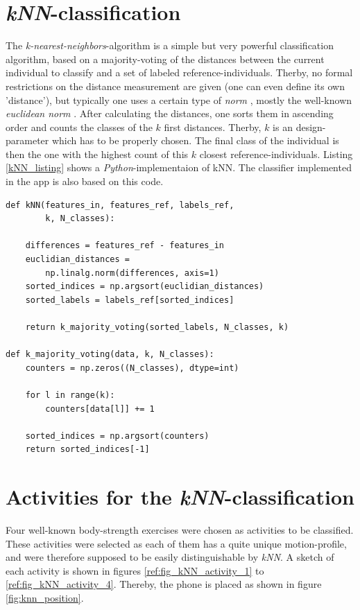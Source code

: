 \documentclass[journal]{IEEEtran}
\begin{document}
\section{\textit{kNN}-classification} 
The \textit{k-nearest-neighbors}-algorithm \cite{noauthor_k-nearest_2021} is a
simple but very powerful classification algorithm, based on a majority-voting of
the distances between the current individual to classify and a set of labeled
reference-individuals. Therby, no formal restrictions on the distance
measurement are given (one can even define its own 'distance'), but typically
one uses a certain type of \textit{norm} \cite{noauthor_norm_2021}, mostly the
well-known \textit{euclidean norm} \cite{noauthor_euclidean_2021}. After
calculating the distances, one sorts them in ascending order and counts the
classes of the $k$ first distances. Therby, $k$ is an design-parameter which
has to be properly chosen. The final class of the individual is then the one with the
highest count of this $k$ closest reference-individuals.\newline
Listing \ref{kNN_listing} shows a \textit{Python}-implementaion of kNN. The
classifier implemented in the app is also based on this code.\newline


\begin{lstlisting}[language=iPython, label=kNN_listing, captionpos=b,caption=A simple python-implementation of \textit{kNN}.]
def kNN(features_in, features_ref, labels_ref, 
        k, N_classes): 

    differences = features_ref - features_in 
    euclidian_distances = 
        np.linalg.norm(differences, axis=1) 
    sorted_indices = np.argsort(euclidian_distances) 
    sorted_labels = labels_ref[sorted_indices]
    
    return k_majority_voting(sorted_labels, N_classes, k)
    
def k_majority_voting(data, k, N_classes): 
    counters = np.zeros((N_classes), dtype=int) 

    for l in range(k): 
        counters[data[l]] += 1
        
    sorted_indices = np.argsort(counters) 
    return sorted_indices[-1]
\end{lstlisting}



\section{Activities for the \textit{kNN}-classification} 
Four well-known body-strength exercises were chosen as activities to be classified.
These activities were selected as each of them has a quite unique 
motion-profile, and were therefore supposed to be easily distinguishable by 
\textit{kNN}. A sketch of each activity is shown in figures 
\ref{ref:fig_kNN_activity_1} to \ref{ref:fig_kNN_activity_4}. 
Thereby, the phone is placed as shown in figure \ref{fig:knn_position}.
\end{document}
